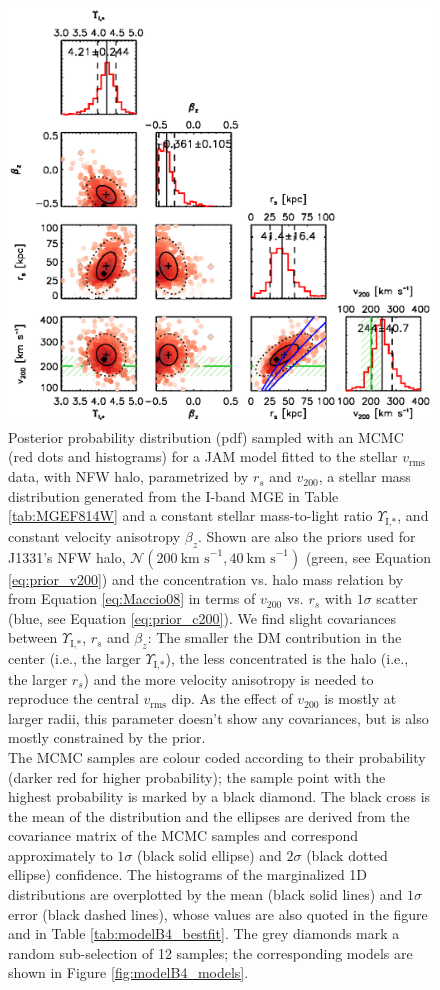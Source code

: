 \documentclass[useAMS,usenatbib]{mnras}
\begin{document}
\begin{figure}
\centering
\includegraphics[width=0.9\linewidth]{fig/B4_contour_plot_short.ps}
\caption{Posterior probability distribution (pdf) sampled with an MCMC (red dots and histograms) for a JAM model fitted to the stellar $v_\text{rms}$ data, with NFW halo, parametrized by $r_s$ and $v_\text{200}$, a stellar mass distribution generated from the I-band MGE in Table \ref{tab:MGEF814W} and a constant stellar mass-to-light ratio $\Upsilon_\text{I,*}$, and constant velocity anisotropy $\beta_z$. Shown are also the priors used for J1331's NFW halo, $\mathscr{N}(200~\text{km s}^{-1},40~\text{km s}^{-1})$ (green, see Equation \eqref{eq:prior_v200}) and the concentration vs. halo mass relation by \citet{Maccio08} from Equation \eqref{eq:Maccio08} in terms of $v_{200}$ vs. $r_s$ with $1\sigma$ scatter (blue, see Equation \eqref{eq:prior_c200}). We find slight covariances between $\Upsilon_\text{I,*}$,  $r_s$ and $\beta_z$: The smaller the DM contribution in the center (i.e., the larger $\Upsilon_\text{I,*}$), the less concentrated is the halo (i.e., the larger $r_s$) and the more velocity anisotropy is needed to reproduce the central $v_\text{rms}$ dip. As the effect of $v_{200}$ is mostly at larger radii, this parameter doesn't show any covariances, but is also mostly constrained by the prior.\\The MCMC samples are colour coded according to their probability (darker red for higher probability); the sample point with the highest probability is marked by a black diamond. The black cross is the mean of the distribution and the ellipses are derived from the covariance matrix of the MCMC samples and correspond approximately to $1\sigma$ (black solid ellipse) and $2\sigma$ (black dotted ellipse) confidence. The histograms of the marginalized 1D distributions are overplotted by the mean (black solid lines) and $1\sigma$ error (black dashed lines), whose values are also quoted in the figure and in Table \ref{tab:modelB4_bestfit}. The grey diamonds mark a random sub-selection of 12 samples; the corresponding models are shown in Figure \ref{fig:modelB4_models}.}
\label{fig:modelB4_triangle}
\end{figure}
\end{document}
